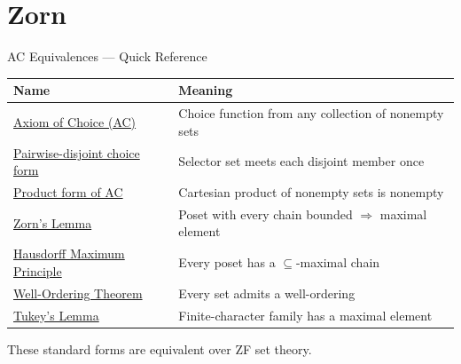 \section{Zorn}


\begin{toolkitbox}{AC Equivalences --- Quick Reference}
\small
\begin{tabular}{l l}
\toprule
\textbf{Name} & \textbf{Meaning} \\
\midrule
\hyperref[ax:choice]{Axiom of Choice (AC)}         & Choice function from any collection of nonempty sets \\
\hyperref[thm:ac-alternative-forms]{Pairwise-disjoint choice form} & Selector set meets each disjoint member once \\
\hyperref[def:arbitrary-product]{Product form of AC}           & Cartesian product of nonempty sets is nonempty \\
\hyperref[thm:zorn]{Zorn's Lemma}                 & Poset with every chain bounded $\Rightarrow$ maximal element \\
\hyperref[thm:hausdorff]{Hausdorff Maximum Principle}  & Every poset has a $\subseteq$-maximal chain \\
\hyperref[def:well-ordered-set]{Well-Ordering Theorem}        & Every set admits a well-ordering \\
\hyperref[thm:ac-alternative-forms]{Tukey's Lemma} & Finite-character family has a maximal element \\
\bottomrule
\end{tabular}

\medskip
These standard forms are equivalent over ZF set theory.
\end{toolkitbox}



